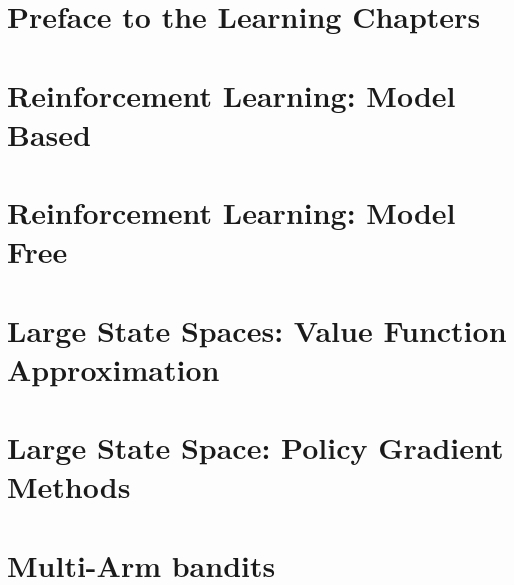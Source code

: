 \documentclass[12pt]{book}
\begin{document}
% 

\chapter{Preface to the Learning Chapters}\label{ym-chapter-learning-preface}


\chapter{Reinforcement Learning: Model Based}\label{chapter-model-based}


\chapter{Reinforcement Learning: Model Free}
\label{chapter:learning-model-free}


\chapter{Large State Spaces: Value Function Approximation}
\label{chapter:function-approximation}


\chapter{Large State Space: Policy Gradient Methods}
\label{chapter:policy-gradient}


\chapter{ Multi-Arm bandits}
\label{chapter:MAB}


% 

% 
\end{document}
